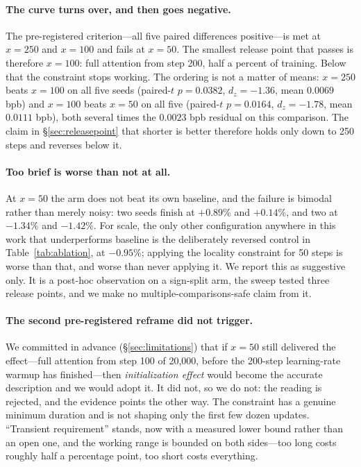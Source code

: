 \documentclass[11pt,a4paper]{article}
\begin{document}
\paragraph{The curve turns over, and then goes negative.} The pre-registered criterion---all five paired differences positive---is met at $x=250$ and $x=100$ and fails at $x=50$. The smallest release point that passes is therefore $x=100$: full attention from step 200, half a percent of training. Below that the constraint stops working. The ordering is not a matter of means: $x=250$ beats $x=100$ on all five seeds (paired-$t$ $p=0.0382$, $d_z=-1.36$, mean $0.0069$ bpb) and $x=100$ beats $x=50$ on all five (paired-$t$ $p=0.0164$, $d_z=-1.78$, mean $0.0111$ bpb), both several times the $0.0023$ bpb residual on this comparison. The claim in \S\ref{sec:releasepoint} that shorter is better therefore holds only down to 250 steps and reverses below it.

\paragraph{Too brief is worse than not at all.} At $x=50$ the arm does not beat its own baseline, and the failure is bimodal rather than merely noisy: two seeds finish at $+0.89$\% and $+0.14$\%, and two at $-1.34$\% and $-1.42$\%. For scale, the only other configuration anywhere in this work that underperforms baseline is the deliberately reversed control in Table~\ref{tab:ablation}, at $-0.95$\%; applying the locality constraint for 50 steps is worse than that, and worse than never applying it. We report this as suggestive only. It is a post-hoc observation on a sign-split arm, the sweep tested three release points, and we make no multiple-comparisons-safe claim from it.

\paragraph{The second pre-registered reframe did not trigger.} We committed in advance (\S\ref{sec:limitations}) that if $x=50$ still delivered the effect---full attention from step 100 of 20{,}000, before the 200-step learning-rate warmup has finished---then \emph{initialization effect} would become the accurate description and we would adopt it. It did not, so we do not: the reading is rejected, and the evidence points the other way. The constraint has a genuine minimum duration and is not shaping only the first few dozen updates. ``Transient requirement'' stands, now with a measured lower bound rather than an open one, and the working range is bounded on both sides---too long costs roughly half a percentage point, too short costs everything.
\end{document}
